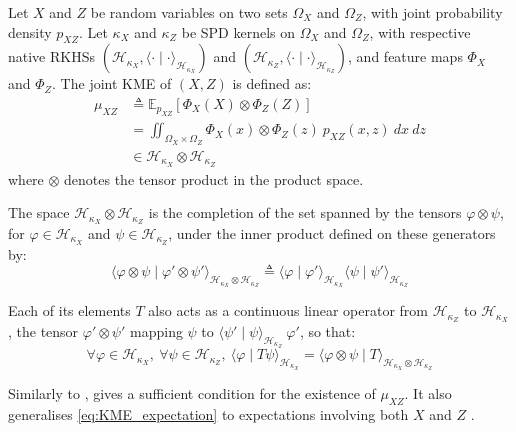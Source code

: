 \begin{definition}\label{th:joint_KME}
	Let $X$ and $Z$ be random variables on two sets $\Omega_X$ and $\Omega_Z$, with joint probability density $p_{XZ}$. Let $\kappa_X$ and $\kappa_Z$ be SPD kernels on $\Omega_X$ and $\Omega_Z$, with respective native RKHSs $(\mathcal{H}_{\kappa_X},\langle\cdot\mid\cdot\rangle_{\mathcal{H}_{\kappa_X}})$ and $(\mathcal{H}_{\kappa_Z},\langle\cdot\mid\cdot\rangle_{\mathcal{H}_{\kappa_Z}})$, and feature maps $\Phi_X$ and $\Phi_Z$. The joint KME of $(X,Z)$ is defined as:
	\begin{equation}
		\begin{aligned}
		\mu_{XZ}&\triangleq\mathbb{E}_{p_{XZ}}\left[\Phi_X(X)\otimes\Phi_Z(Z)\right]\\
		&=\iint_{\Omega_X\times\Omega_Z}{\Phi_X(x)\otimes\Phi_Z(z)\:p_{XZ}(x,z)\:dx\:dz}\\
		&\in\mathcal{H}_{\kappa_X}\otimes\mathcal{H}_{\kappa_Z}
		\end{aligned}
	\end{equation}
	where $\otimes$ denotes the tensor product in the product space.
\end{definition}

The space $\mathcal{H}_{\kappa_X}\otimes\mathcal{H}_{\kappa_Z}$ is the completion of the set spanned by the tensors $\varphi\otimes\psi$, for $\varphi\in\mathcal{H}_{\kappa_X}$ and $\psi\in\mathcal{H}_{\kappa_Z}$, under the inner product defined on these generators by:
\begin{equation}
	\langle\varphi\otimes\psi\mid\varphi'\otimes\psi'\rangle_{\mathcal{H}_{\kappa_X}\otimes\mathcal{H}_{\kappa_Z}}\triangleq\langle\varphi\mid\varphi'\rangle_{\mathcal{H}_{\kappa_X}}\langle\psi\mid\psi'\rangle_{\mathcal{H}_{\kappa_Z}}
\end{equation}

Each of its elements $T$ also acts as a continuous linear operator from $\mathcal{H}_{\kappa_Z}$ to $\mathcal{H}_{\kappa_X}$, the tensor $\varphi'\otimes\psi'$ mapping $\psi$ to $\langle\psi'\mid\psi\rangle_{\mathcal{H}_{\kappa_Z}}\:\varphi'$, so that:
\begin{equation}
	\forall\varphi\in\mathcal{H}_{\kappa_X},\:\forall\psi\in\mathcal{H}_{\kappa_Z},\:\langle\varphi\mid T\psi\rangle_{\mathcal{H}_{\kappa_X}}=\langle\varphi\otimes\psi\mid T\rangle_{\mathcal{H}_{\kappa_X}\otimes\mathcal{H}_{\kappa_Z}}
\end{equation}

Similarly to ,  gives a sufficient condition for the existence of $\mu_{XZ}$. It also generalises \eqref{eq:KME_expectation} to expectations involving both $X$ and $Z$ \cite{bib:kernel-embeddings}.

